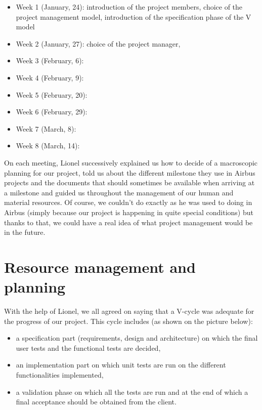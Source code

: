 \documentclass{report}
\begin{document}
\begin{itemize}
\item Week 1 (January, 24): introduction of the project members, choice of the project management model, introduction of the specification phase of the V model
\item Week 2 (January, 27): choice of the project manager, 
\item Week 3 (February, 6):
\item Week 4 (February, 9):
\item Week 5 (February, 20):
\item Week 6 (February, 29):
\item Week 7 (March, 8):
\item Week 8 (March, 14):
\end{itemize}

On each meeting, Lionel successively explained us how to decide of a macroscopic planning for our project, told us about the different milestone they use in Airbus projects and the documents that should sometimes be available when arriving at a milestone and guided us throughout the management of our human and material resources. Of course, we couldn't do exactly as he was used to doing in Airbus (simply because our project is happening in quite special conditions) but thanks to that, we could have a real idea of what project management would be in the future. 

\section{Resource management and planning}

With the help of Lionel, we all agreed on saying that a V-cycle was adequate for the progress of our project. This cycle includes (as shown on the picture below):

\begin{itemize}
\item a specification part (requirements, design and architecture) on which the final user tests and the functional tests are decided,
\item an implementation part on which unit tests are run on the different functionalities implemented,
\item a validation phase on which all the tests are run and at the end of which a final acceptance should be obtained from the client.
\end{itemize}
\end{document}
